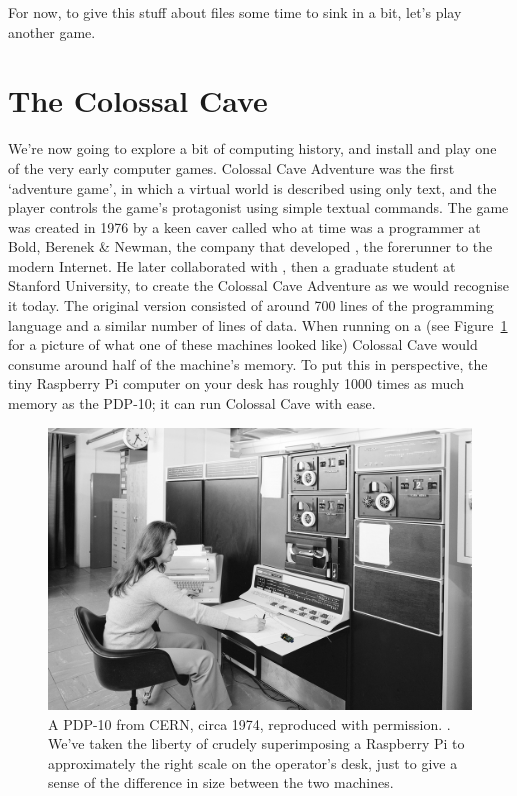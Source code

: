 For now, to give this stuff about files some time to sink in a bit, let's play another game.

\FloatBarrier
\section{The Colossal Cave}

We're now going to explore a bit of computing history, and install and play one of the very early computer games. Colossal Cave Adventure was the first `adventure game', in which a virtual world is described using only text, and the player controls the game's protagonist using simple textual commands. The game was created in 1976 by a keen caver called  who at time was a programmer at Bold, Berenek \& Newman, the company that developed , the forerunner to the modern Internet. He later collaborated with , then a graduate student at Stanford University, to create the Colossal Cave Adventure as we would recognise it today. The original version consisted of around 700 lines of the  programming language and a similar number of lines of data. When running on a  (see Figure~\ref{figure:cern-pdp-10} for a picture of what one of these machines looked like) Colossal Cave would consume around half of the machine's memory. To put this in perspective, the tiny Raspberry Pi computer on your desk has roughly 1000 times as much memory as the PDP-10; it can run Colossal Cave with ease.

\begin{figure}[t]
\centerline{\includegraphics[width=14cm]{images/cern-pdp10+pi.png}}
\caption{A PDP-10 from CERN, circa 1974, reproduced with permission. . We've taken the liberty of crudely superimposing a Raspberry Pi to approximately the right scale on the operator's desk, just to give a sense of the difference in size between the two machines.}\label{figure:cern-pdp-10}
\end{figure}

